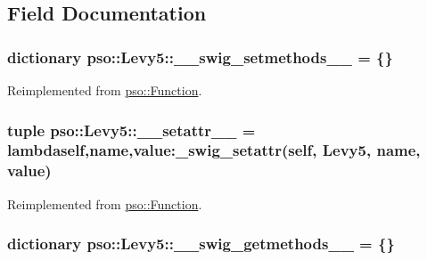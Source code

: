\subsection{Field Documentation}
\hypertarget{classpso_1_1Levy5_93d6c8d420b6ad862c41073e1764d31e}{
\subsubsection{\setlength{\rightskip}{0pt plus 5cm}dictionary {\bf pso::Levy5::\_\-\_\-swig\_\-setmethods\_\-\_\-} = \{\}}}
\label{classpso_1_1Levy5_93d6c8d420b6ad862c41073e1764d31e}




Reimplemented from \hyperlink{classpso_1_1Function_2334bfe507115d58047f67960dde71d3}{pso::Function}.\hypertarget{classpso_1_1Levy5_4460b9b9e78befc1daa52a2cedfb6178}{
\subsubsection{\setlength{\rightskip}{0pt plus 5cm}tuple {\bf pso::Levy5::\_\-\_\-setattr\_\-\_\-} = lambdaself,name,value:\_\-swig\_\-setattr(self, {\bf Levy5}, name, value)}}
\label{classpso_1_1Levy5_4460b9b9e78befc1daa52a2cedfb6178}




Reimplemented from \hyperlink{classpso_1_1Function_cd8775cf6aadc3fdf4e6d82158ef10fb}{pso::Function}.\hypertarget{classpso_1_1Levy5_2bd3aa2316c11de1d2c76347089ec9fb}{
\subsubsection{\setlength{\rightskip}{0pt plus 5cm}dictionary {\bf pso::Levy5::\_\-\_\-swig\_\-getmethods\_\-\_\-} = \{\}}}
\label{classpso_1_1Levy5_2bd3aa2316c11de1d2c76347089ec9fb}




